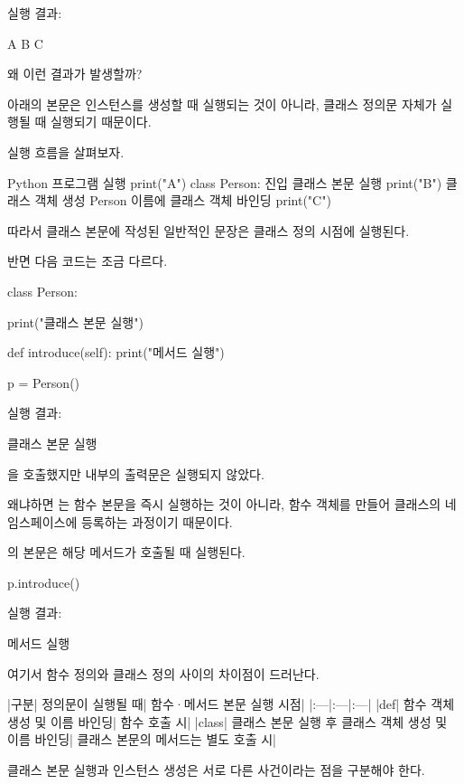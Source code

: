 실행 결과:

\begin{dhkzsh}
A
B
C
\end{dhkzsh}

왜 이런 결과가 발생할까?

아래의 본문은 인스턴스를 생성할 때 실행되는 것이 아니라, 클래스 정의문 자체가 실행될 때 실행되기 때문이다.

실행 흐름을 살펴보자.

\begin{dhksmry}[centered]
Python 프로그램 실행
\da
print("A")
\da
class Person: 진입
\da
클래스 본문 실행
\da
print("B")
\da
클래스 객체 생성
\da
Person 이름에 클래스 객체 바인딩
\da
print("C")
\end{dhksmry}

따라서 클래스 본문에 작성된 일반적인 문장은 클래스 정의 시점에 실행된다.

반면 다음 코드는 조금 다르다.

\begin{dhkcode}
class Person:

    print("클래스 본문 실행")

    def introduce(self):
        print("메서드 실행")


p = Person()
\end{dhkcode}

실행 결과:

\begin{dhkzsh}
클래스 본문 실행
\end{dhkzsh}

을 호출했지만  내부의 출력문은 실행되지 않았다.

왜냐하면 는 함수 본문을 즉시 실행하는 것이 아니라, 함수 객체를 만들어 클래스의 네임스페이스에 등록하는 과정이기 때문이다.

의 본문은 해당 메서드가 호출될 때 실행된다.

\begin{dhkcode}
p.introduce()
\end{dhkcode}

실행 결과:

\begin{dhkzsh}
메서드 실행
\end{dhkzsh}

여기서 함수 정의와 클래스 정의 사이의 차이점이 드러난다.

\begin{dhktable}
|구분|	정의문이 실행될 때|	함수·메서드 본문 실행 시점|
|:---|:---|:---|
|def|	함수 객체 생성 및 이름 바인딩|	함수 호출 시|
|class|	클래스 본문 실행 후 클래스 객체 생성 및 이름 바인딩|	클래스 본문의 메서드는 별도 호출 시|
\end{dhktable}
클래스 본문 실행과 인스턴스 생성은 서로 다른 사건이라는 점을 구분해야 한다.

